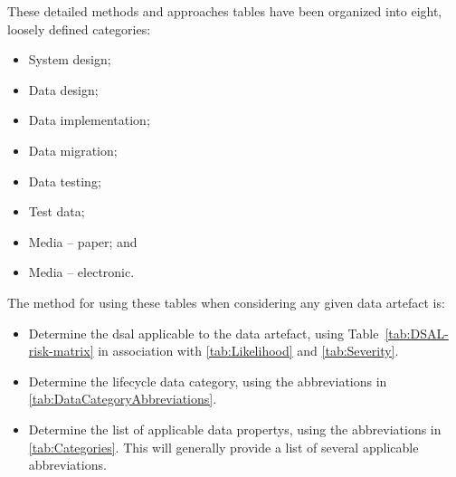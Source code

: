 These detailed methods and approaches tables have been organized into eight, loosely defined categories:
\begin{itemize}
  \item System design;
  \item Data design;
  \item Data implementation;
  \item Data migration;
  \item Data testing;
  \item Test data;
  \item Media -- paper; and 
  \item Media -- electronic.
\end{itemize}

The method for using these tables when considering any given \gls{data artefact} is:
\begin{itemize}
    \item Determine the \gls{dsal} applicable to the \gls{data artefact}, using Table~\ref*{tab:DSAL-risk-matrix} in association with \autoref{tab:Likelihood} and \autoref{tab:Severity}.
    \item Determine the lifecycle data category, using the abbreviations in \autoref{tab:DataCategoryAbbreviations}.
    \item Determine the list of applicable \glspl{data property}, using the abbreviations in \autoref{tab:Categories}. This will generally provide a list of several applicable abbreviations.
\end{itemize}

